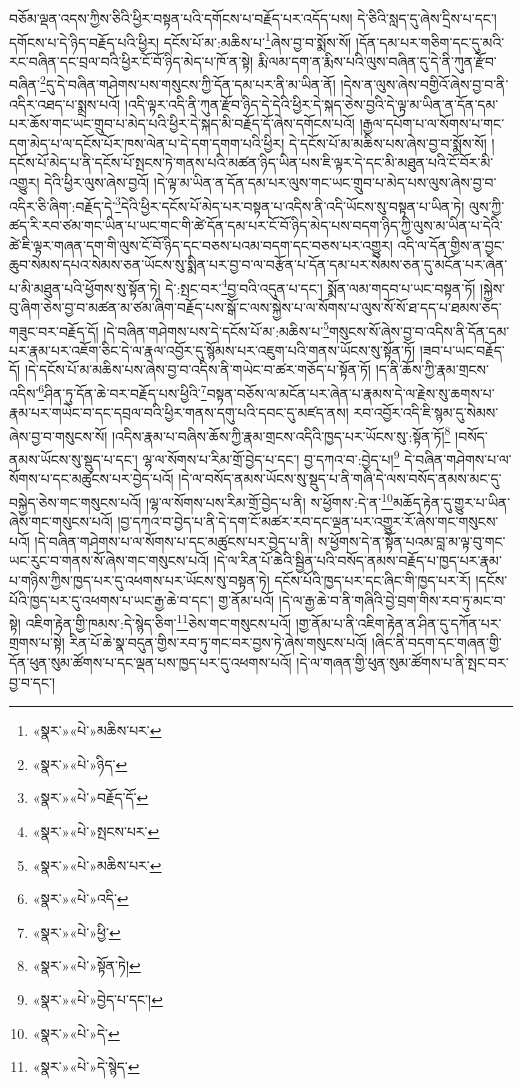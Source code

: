 བཅོམ་ལྡན་འདས་ཀྱིས་ཅིའི་ཕྱིར་བསྟན་པའི་དགོངས་པ་བརྗོད་པར་འདོད་པས། དེ་ཅིའི་སླད་དུ་ཞེས་དྲིས་པ་དང་། དགོངས་པ་དེ་ཉིད་བརྗོད་པའི་ཕྱིར། དངོས་པོ་མ་:མཆིས་པ་\footnote{«སྣར་»«པེ་»མཆིས་པར་}ཞེས་བྱ་བ་སྨོས་སོ། །དོན་དམ་པར་གཅིག་དང་དུ་མའི་རང་བཞིན་དང་བྲལ་བའི་ཕྱིར་ངོ་བོ་ཉིད་མེད་པ་ཁོ་ན་སྟེ། རྨི་ལམ་དག་ན་རྨིས་པའི་ལུས་བཞིན་དུ་དེ་ནི་ཀུན་རྫོབ་བཞིན་\footnote{«སྣར་»«པེ་»ཉིད་}དུ་དེ་བཞིན་གཤེགས་པས་གསུངས་ཀྱི་དོན་དམ་པར་ནི་མ་ཡིན་ནོ། །དེས་ན་ལུས་ཞེས་བགྱིའོ་ཞེས་བྱ་བ་ནི་འདིར་འཐད་པ་སྨྲས་པའོ། །འདི་ལྟར་འདི་ནི་ཀུན་རྫོབ་ཉིད་དེ་དེའི་ཕྱིར་དེ་སྐད་ཅེས་བྱའི་དེ་ལྟ་མ་ཡིན་ན་དོན་དམ་པར་ཆོས་གང་ཡང་གྲུབ་པ་མེད་པའི་ཕྱིར་དེ་སྐད་མི་བརྗོད་དོ་ཞེས་དགོངས་པའོ། །རྒྱལ་དཔོག་པ་ལ་སོགས་པ་གང་དག་མེད་པ་ལ་དངོས་པོར་ཁས་ལེན་པ་དེ་དག་དགག་པའི་ཕྱིར། དེ་དངོས་པོ་མ་མཆིས་པས་ཞེས་བྱ་བ་སྨོས་སོ། །དངོས་པོ་མེད་པ་ནི་དངོས་པོ་སྤངས་ཏེ་གནས་པའི་མཚན་ཉིད་ཡིན་པས་ཇི་ལྟར་དེ་དང་མི་མཐུན་པའི་ངོ་བོར་མི་འགྱུར། དེའི་ཕྱིར་ལུས་ཞེས་བྱའོ། །དེ་ལྟ་མ་ཡིན་ན་དོན་དམ་པར་ལུས་གང་ཡང་གྲུབ་པ་མེད་པས་ལུས་ཞེས་བྱ་བ་འདིར་ཅི་ཞིག་:བརྗོད་དེ་\footnote{«སྣར་»«པེ་»བརྗོད་དོ་}དེའི་ཕྱིར་དངོས་པོ་མེད་པར་བསྟན་པ་འདིས་ནི་འདི་ཡོངས་སུ་བསྟན་པ་ཡིན་ཏེ། ལུས་ཀྱི་ཚད་རི་རབ་ཙམ་གང་ཡིན་པ་ཡང་གང་གི་ཚེ་དོན་དམ་པར་ངོ་བོ་ཉིད་མེད་པས་བདག་ཉིད་ཀྱི་ལུས་མ་ཡིན་པ་དེའི་ཚེ་ཇི་ལྟར་གཞན་དག་གི་ལུས་ངོ་བོ་ཉིད་དང་བཅས་པའམ་བདག་དང་བཅས་པར་འགྱུར། འདི་ལ་དོན་གྱིས་ན་བྱང་ཆུབ་སེམས་དཔའ་སེམས་ཅན་ཡོངས་སུ་སྨིན་པར་བྱ་བ་ལ་བརྩོན་པ་དོན་དམ་པར་སེམས་ཅན་དུ་མངོན་པར་ཞེན་པ་མི་མཐུན་པའི་ཕྱོགས་སུ་སྟོན་ཏེ། དེ་:སྤང་བར་\footnote{«སྣར་»«པེ་»སྤངས་པར་}བྱ་བའི་འདུན་པ་དང་། སྨོན་ལམ་གདབ་པ་ཡང་བསྟན་ཏོ། །སྐྱེས་བུ་ཞིག་ཅེས་བྱ་བ་མཚན་མ་ཙམ་ཞིག་བརྗོད་པས་སྒོ་ང་ལས་སྐྱེས་པ་ལ་སོགས་པ་ལུས་སོ་སོ་ཐ་དད་པ་ཐམས་ཅད་གཟུང་བར་བརྗོད་དོ། །དེ་བཞིན་གཤེགས་པས་དེ་དངོས་པོ་མ་:མཆིས་པ་\footnote{«སྣར་»«པེ་»མཆིས་པར་}གསུངས་སོ་ཞེས་བྱ་བ་འདིས་ནི་དོན་དམ་པར་རྣམ་པར་འཇོག་ཅིང་དེ་ལ་རྣལ་འབྱོར་དུ་སྙོམས་པར་འཇུག་པའི་གནས་ཡོངས་སུ་སྟོན་ཏོ། །ཟབ་པ་ཡང་བརྗོད་དོ། །དེ་དངོས་པོ་མ་མཆིས་པས་ཞེས་བྱ་བ་འདིས་ནི་གཡེང་བ་ཚར་གཅོད་པ་སྟོན་ཏོ། །ད་ནི་ཆོས་ཀྱི་རྣམ་གྲངས་འདིས་\footnote{«སྣར་»«པེ་»འདི་}ཤིན་ཏུ་དོན་ཆེ་བར་བརྗོད་པས་ཕྱིའི་\footnote{«སྣར་»«པེ་»ཕྱི་}བསྟན་བཅོས་ལ་མངོན་པར་ཞེན་པ་རྣམས་དེ་ལ་རྗེས་སུ་ཆགས་པ་རྣམ་པར་གཡེང་བ་དང་དབྲལ་བའི་ཕྱིར་གནས་དགུ་པའི་དབང་དུ་མཛད་ནས། རབ་འབྱོར་འདི་ཇི་སྙམ་དུ་སེམས་ཞེས་བྱ་བ་གསུངས་སོ། །འདིས་རྣམ་པ་བཞིས་ཆོས་ཀྱི་རྣམ་གྲངས་འདིའི་ཁྱད་པར་ཡོངས་སུ་:སྟོན་ཏོ།\footnote{«སྣར་»«པེ་»སྟོན་ཏེ།} །བསོད་ནམས་ཡོངས་སུ་སྡུད་པ་དང་། ལྷ་ལ་སོགས་པ་རིམ་གྲོ་བྱེད་པ་དང་། བྱ་དཀའ་བ་:བྱེད་པ།\footnote{«སྣར་»«པེ་»བྱེད་པ་དང་།} དེ་བཞིན་གཤེགས་པ་ལ་སོགས་པ་དང་མཚུངས་པར་བྱེད་པའོ། །དེ་ལ་བསོད་ནམས་ཡོངས་སུ་སྡུད་པ་ནི་གཞི་དེ་ལས་བསོད་ནམས་མང་དུ་བསྐྱེད་ཅེས་གང་གསུངས་པའོ། །ལྷ་ལ་སོགས་པས་རིམ་གྲོ་བྱེད་པ་ནི། ས་ཕྱོགས་:དེ་ན་\footnote{«སྣར་»«པེ་»དེ་}མཆོད་རྟེན་དུ་གྱུར་པ་ཡིན་ཞེས་གང་གསུངས་པའོ། །བྱ་དཀའ་བ་བྱེད་པ་ནི་དེ་དག་ངོ་མཚར་རབ་དང་ལྡན་པར་འགྱུར་རོ་ཞེས་གང་གསུངས་པའོ། །དེ་བཞིན་གཤེགས་པ་ལ་སོགས་པ་དང་མཚུངས་པར་བྱེད་པ་ནི། ས་ཕྱོགས་དེ་ན་སྟོན་པའམ་བླ་མ་ལྟ་བུ་གང་ཡང་རུང་བ་གནས་སོ་ཞེས་གང་གསུངས་པའོ། །དེ་ལ་རིན་པོ་ཆེའི་སྦྱིན་པའི་བསོད་ནམས་བརྗོད་པ་ཁྱད་པར་རྣམ་པ་གཉིས་ཀྱིས་ཁྱད་པར་དུ་འཕགས་པར་ཡོངས་སུ་བསྟན་ཏེ། དངོས་པོའི་ཁྱད་པར་དང་ཞིང་གི་ཁྱད་པར་རོ། །དངོས་པོའི་ཁྱད་པར་དུ་འཕགས་པ་ཡང་རྒྱ་ཆེ་བ་དང་། གྱ་ནོམ་པའོ། །དེ་ལ་རྒྱ་ཆེ་བ་ནི་གཞིའི་བྱེ་བྲག་གིས་རབ་ཏུ་མང་བ་སྟེ། འཇིག་རྟེན་གྱི་ཁམས་:དེ་སྙེད་ཅིག་\footnote{«སྣར་»«པེ་»དེ་སྙེད་}ཅེས་གང་གསུངས་པའོ། །གྱ་ནོམ་པ་ནི་འཇིག་རྟེན་ན་ཤིན་དུ་དཀོན་པར་གྲགས་པ་སྟེ། རིན་པོ་ཆེ་སྣ་བདུན་གྱིས་རབ་ཏུ་གང་བར་བྱས་ཏེ་ཞེས་གསུངས་པའོ། །ཞིང་ནི་བདག་དང་གཞན་གྱི་དོན་ཕུན་སུམ་ཚོགས་པ་དང་ལྡན་པས་ཁྱད་པར་དུ་འཕགས་པའོ། །དེ་ལ་གཞན་གྱི་ཕུན་སུམ་ཚོགས་པ་ནི་སྤང་བར་བྱ་བ་དང་། 